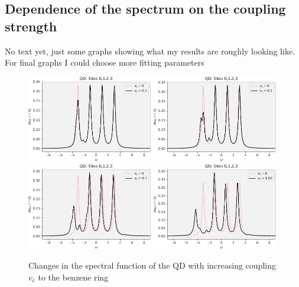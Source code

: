 \subsection{Dependence of the spectrum on the coupling strength}
\color{red}
No text yet, just some graphs showing what my results are roughly looking like. For final graphs I could choose more fitting parameters
\color{black}

\begin{figure}[!hbt]
    \centering
    \includegraphics[width=0.49\textwidth]{graph/spectrum_vc_sweep/QD_All_020.pdf}
    \includegraphics[width=0.49\textwidth]{graph/spectrum_vc_sweep/QD_All_030.pdf}
    \includegraphics[width=0.49\textwidth]{graph/spectrum_vc_sweep/QD_All_070.pdf}
    \includegraphics[width=0.49\textwidth]{graph/spectrum_vc_sweep/QD_All_100.pdf}
    \caption{Changes in the spectral function of the QD with increasing coupling $v_c$ to the benzene ring}
    \label{fig:spectrum_vc_sweep_QD}
\end{figure}

